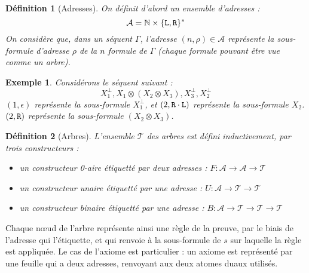 \documentclass[11pt,a4paper]{article}
\newtheorem{example}{Exemple}
\newtheorem{definition}{Définition}
\newcommand*{\orth}{^\perp}
\newcommand*{\tensor}{\otimes}
\newcommand*{\sequent}{\Gamma}
\newcommand*{\Left}{\textnormal{\texttt{L}}}
\newcommand*{\Right}{\textnormal{\texttt{R}}}
\newcommand*{\trees}{\ensuremath{\mathcal{T}}}
\begin{document}
\begin{definition}[Adresses]
On définit d'abord un ensemble d'adresses :
\begin{equation*}
\mathcal{A} = \mathbb{N} \times \{ \Left, \Right\}^{*}  
\end{equation*}
On considère que, dans un séquent $\sequent$, l'adresse $(n, \rho) \in \mathcal{A}$ représente la sous-formule d'adresse $\rho$ de la $n$\ieme{} formule de $\sequent$ (chaque formule pouvant être vue comme un arbre).
\end{definition}

\begin{example}
Considérons le séquent suivant : 
\begin{equation*}
X_1\orth, X_1 \tensor (X_2 \tensor X_3), X_3\orth, X_2\orth
\end{equation*}
$(1, \epsilon)$ représente la sous-formule $X_1\orth$, et $(2, \Right \cdot \Left)$ représente la sous-formule $X_2$. $(2, \Right)$ représente la sous-formule $(X_2 \tensor X_3)$.
\end{example}

\begin{definition}[Arbres]
L'ensemble \trees{} des arbres est défini inductivement, par trois constructeurs :
\begin{itemize}
  \item un constructeur 0-aire étiquetté par deux adresses : $F: \mathcal{A} \rightarrow \mathcal{A} \rightarrow \trees$
  \item un constructeur unaire étiquetté par une adresse : $U: \mathcal{A} \rightarrow \trees \rightarrow \trees$
  \item un constructeur binaire étiquetté par une adresse : $B: \mathcal{A} \rightarrow \trees \rightarrow \trees \rightarrow \trees$
\end{itemize}
\end{definition}

Chaque n\oe ud de l'arbre représente ainsi une règle de la preuve, par le biais de l'adresse qui l'étiquette, et qui renvoie à la sous-formule de $s$ sur laquelle la règle est appliquée. Le cas de l'axiome est particulier : un axiome est représenté par une feuille qui a deux adresses, renvoyant aux deux atomes duaux utilisés.
\end{document}
